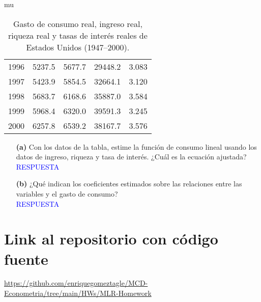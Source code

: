 mu\documentclass[10pt]{article}
\begin{document}
\begin{table}[H]
\begin{tabular}{lcccc}
        1996 & 5237.5 & 5677.7 & 29448.2 &   3.083 \\
        1997 & 5423.9 & 5854.5 & 32664.1 &   3.120 \\
        1998 & 5683.7 & 6168.6 & 35887.0 &   3.584 \\
        1999 & 5968.4 & 6320.0 & 39591.3 &   3.245 \\
        2000 & 6257.8 & 6539.2 & 38167.7 &   3.576 \\
        \hline
    \end{tabular}
    \caption{Gasto de consumo real, ingreso real, riqueza real y tasas de interés reales de Estados Unidos (1947--2000).}
    \label{tab:consumo_usa}
\end{table}

\begin{enumerate}
    \item[\textbf{(a)}] Con los datos de la tabla, estime la función de consumo lineal usando los datos de ingreso, riqueza y tasa
    de interés. ¿Cuál es la ecuación ajustada?\\
    \textcolor{blue}{
            RESPUESTA
    }

    \item[\textbf{(b)}] ¿Qué indican los coeficientes estimados sobre las relaciones entre las variables y el gasto de consumo?\\
    \textcolor{blue}{
            RESPUESTA
    }
\end{enumerate}
\section{Link al repositorio con código fuente}
\url{https://github.com/enriquegomeztagle/MCD-Econometria/tree/main/HWs/MLR-Homework}
\end{document}
